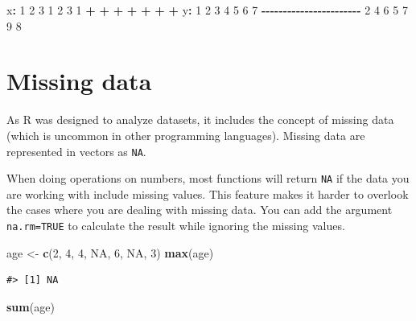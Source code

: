 \documentclass[
]{book}
\newenvironment{Shaded}{\begin{snugshade}}{\end{snugshade}}
\newcommand{\ConstantTok}[1]{\textcolor[rgb]{0.56,0.35,0.01}{#1}}
\newcommand{\DecValTok}[1]{\textcolor[rgb]{0.00,0.00,0.81}{#1}}
\newcommand{\FunctionTok}[1]{\textcolor[rgb]{0.13,0.29,0.53}{\textbf{#1}}}
\newcommand{\NormalTok}[1]{#1}
\newcommand{\OtherTok}[1]{\textcolor[rgb]{0.56,0.35,0.01}{#1}}
\newcommand{\SpecialCharTok}[1]{\textcolor[rgb]{0.81,0.36,0.00}{\textbf{#1}}}
\begin{document}
\begin{Shaded}
\begin{Highlighting}[]
\NormalTok{x}\SpecialCharTok{:}  \DecValTok{1}  \DecValTok{2}  \DecValTok{3}  \DecValTok{1}  \DecValTok{2}  \DecValTok{3}  \DecValTok{1}
    \SpecialCharTok{+}  \SpecialCharTok{+}  \SpecialCharTok{+}  \SpecialCharTok{+}  \SpecialCharTok{+}  \SpecialCharTok{+}  \SpecialCharTok{+}
\NormalTok{y}\SpecialCharTok{:}  \DecValTok{1}  \DecValTok{2}  \DecValTok{3}  \DecValTok{4}  \DecValTok{5}  \DecValTok{6}  \DecValTok{7}
\SpecialCharTok{{-}{-}{-}{-}{-}{-}{-}{-}{-}{-}{-}{-}{-}{-}{-}{-}{-}{-}{-}{-}{-}{-}{-}}
    \DecValTok{2}  \DecValTok{4}  \DecValTok{6}  \DecValTok{5}  \DecValTok{7}  \DecValTok{9}  \DecValTok{8}
\end{Highlighting}
\end{Shaded}

\section{Missing data}\label{missing-data}

As R was designed to analyze datasets, it includes the concept of missing data
(which is uncommon in other programming languages). Missing data are represented
in vectors as \texttt{NA}.

When doing operations on numbers, most functions will return \texttt{NA} if the data
you are working with include missing values. This feature
makes it harder to overlook the cases where you are dealing with missing data.
You can add the argument \texttt{na.rm=TRUE} to calculate the result while ignoring
the missing values.

\begin{Shaded}
\begin{Highlighting}[]
\NormalTok{age }\OtherTok{\textless{}{-}} \FunctionTok{c}\NormalTok{(}\DecValTok{2}\NormalTok{, }\DecValTok{4}\NormalTok{, }\DecValTok{4}\NormalTok{, }\ConstantTok{NA}\NormalTok{, }\DecValTok{6}\NormalTok{, }\ConstantTok{NA}\NormalTok{, }\DecValTok{3}\NormalTok{)}
\FunctionTok{max}\NormalTok{(age)}
\end{Highlighting}
\end{Shaded}

\begin{verbatim}
#> [1] NA
\end{verbatim}

\begin{Shaded}
\begin{Highlighting}[]
\FunctionTok{sum}\NormalTok{(age)}
\end{Highlighting}
\end{Shaded}
\end{document}
